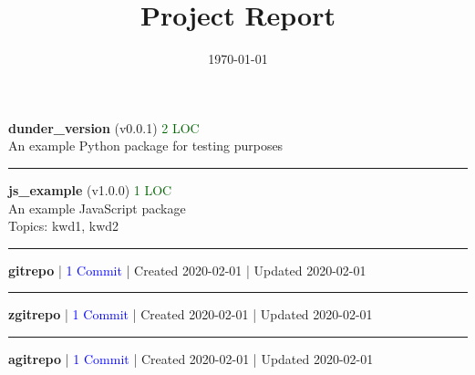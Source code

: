 \documentclass[]{article}
\begin{document}
\title{Project Report}
\author{}
\date{\today}
\maketitle
\textbf{dunder\_version}
(v0.0.1)
\textcolor{darkgreen}{2 LOC}
\\
An example Python package for testing purposes
\\
\noindent\rule{\textwidth}{0.4pt}


\vspace{0.5cm}
\textbf{js\_example}
(v1.0.0)
\textcolor{darkgreen}{1 LOC}
\\
An example JavaScript package
\\
Topics: kwd1, kwd2
\\
\noindent\rule{\textwidth}{0.4pt}


\vspace{0.5cm}
\textbf{gitrepo}
|
\textcolor{blue}{1 Commit}
|
Created 2020-02-01
|
Updated 2020-02-01
\\
\noindent\rule{\textwidth}{0.4pt}


\vspace{0.5cm}
\textbf{zgitrepo}
|
\textcolor{blue}{1 Commit}
|
Created 2020-02-01
|
Updated 2020-02-01
\\
\noindent\rule{\textwidth}{0.4pt}


\vspace{0.5cm}
\textbf{agitrepo}
|
\textcolor{blue}{1 Commit}
|
Created 2020-02-01
|
Updated 2020-02-01
\\
\end{document}
